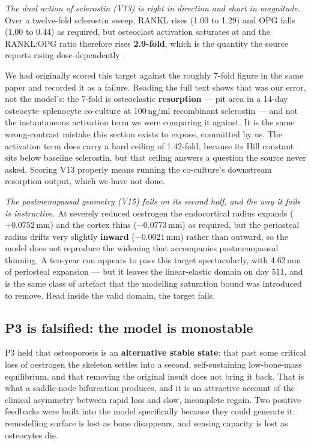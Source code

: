 \documentclass[10pt,letterpaper]{article}
\begin{document}
\emph{The dual action of sclerostin (V13) is right in direction and short in
magnitude.} Over a twelve-fold sclerostin sweep, RANKL rises (1.00 to 1.29) and
OPG falls (1.00 to 0.44) as required, but osteoclast activation saturates at
and the RANKL:OPG ratio therefore rises \textbf{2.9-fold}, which is the quantity
the source reports rising dose-dependently \cite{wijenayaka2011}.

We had originally scored this target against the roughly 7-fold figure in the
same paper and recorded it as a failure. Reading the full text shows that was our
error, not the model's: the 7-fold is osteoclastic \textbf{resorption} --- pit
area in a 14-day osteocyte--splenocyte co-culture at 100\,ng/ml recombinant
sclerostin --- and not the instantaneous activation term we were comparing it
against. It is the same wrong-contrast mistake this section exists to expose,
committed by us. The activation term does carry a hard ceiling of 1.42-fold,
because its Hill constant sits below baseline sclerostin, but that ceiling
answers a question the source never asked. Scoring V13 properly means running the
co-culture's downstream resorption output, which we have not done.

\emph{The postmenopausal geometry (V15) fails on its second half, and the way it
fails is instructive.} At severely reduced oestrogen the endocortical radius
expands ($+0.0752$\,mm) and the cortex thins ($-0.0773$\,mm) as required, but the
periosteal radius drifts very slightly \textbf{inward} ($-0.0021$\,mm) rather
than outward, so the model does not reproduce the widening that accompanies
postmenopausal thinning. A ten-year run appears to pass this target
spectacularly, with 4.62\,mm of periosteal expansion --- but it leaves the
linear-elastic domain on day 511, and is the same class of artefact that the
modelling saturation bound was introduced to remove. Read inside the valid
domain, the target fails.

\subsection*{P3 is falsified: the model is monostable}

P3 held that osteoporosis is an \textbf{alternative stable state}: that past
some critical loss of oestrogen the skeleton settles into a second,
self-sustaining low-bone-mass equilibrium, and that removing the original
insult does not bring it back. That is what a saddle-node bifurcation
produces, and it is an attractive account of the clinical asymmetry between
rapid loss and slow, incomplete regain. Two positive feedbacks were built
into the model specifically because they could generate it: remodelling
surface is lost as bone disappears, and sensing capacity is lost as
osteocytes die.
\end{document}
